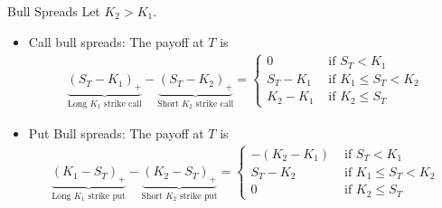 \documentclass[10pt,handout]{beamer}
\theoremstyle{definition}
\begin{document}
\begin{frame}{Bull Spreads}
  Let $K_2 > K_1$.
  \begin{itemize}
    \item Call bull spreads: The payoff at $T$ is \vspace{-3mm}
      \begin{align*}
        \underbrace{(S_T - K_1)_+}_{\text{Long }K_1\text{ strike call}} - \underbrace{(S_T - K_2)_+}_{\text{Short }K_2\text{ strike call}} = \begin{cases}0 & \text{ if } S_T < K_1\\ S_T - K_1 & \text{ if } K_1\leqslant S_T < K_2 \\K_2 - K_1 & \text{ if } K_2\leqslant S_T \end{cases}
      \end{align*}
    \item Put Bull spreads: The payoff at $T$ is \vspace{-3mm}
      \begin{align*}
        \underbrace{(K_1 - S_T)_+}_{\text{Long }K_1\text{ strike put}} - \underbrace{(K_2 - S_T)_+}_{\text{Short }K_2\text{ strike put}} = \begin{cases}-(K_2 - K_1) & \text{ if } S_T < K_1\\ S_T - K_2 & \text{ if } K_1\leqslant S_T < K_2 \\ 0 & \text{ if } K_2\leqslant S_T \end{cases}
      \end{align*}
  \end{itemize}


\end{frame}
\end{document}
